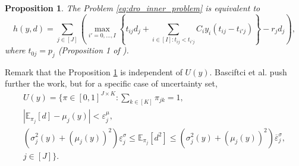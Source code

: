 \documentclass[12pt, letterpaper]{article}
\newcommand{\E}{\mathbb{E}}
\newtheorem{proposition}{Proposition}
\begin{document}
	\begin{proposition} \label{prop:duality_inner_problem}
		The Problem \eqref{eq:dro_inner_problem} is equivalent to
		\begin{equation} \label{eq:dro_equiv_inner_problem}
			h(y, d) = \sum_{j \in [J]} \left(\max_{i' = 0, \dots, I} \left\{t_{ij} d_j + \sum_{i \in [I]: t_{ij} < t_{i'j}} C_{i}y_{i}(t_{ij} - t_{i'j})\right\} - r_j d_j\right),
		\end{equation}
		where $t_{0j} = p_j$ (Proposition 1 of \cite{basciftci_distributionally_2021}).
	\end{proposition}
	
	Remark that the Proposition \ref{prop:duality_inner_problem} is independent of $U(y)$. Basciftci et al. push further the work, but for a specific case of uncertainty set,
	\begin{equation} \label{eq:def_dd_BAS_uncertainty_set}
		\begin{split}
			U(y) = \Bigg\{
				\pi \in [0, 1]^{J \times K} : \sum_{k \in [K]} \pi_{jk} = 1, \\
				\left|\E_{\pi_j}[d] - \mu_j(y)\right| < \varepsilon_j^\mu, \\
				\left(\sigma_j^2(y) + (\mu_j(y))^2\right)\underline{\varepsilon}_j^\sigma \le
				\E_{\pi_j}[d^2] \le \left(\sigma_j^2(y) + (\mu_j(y))^2\right)\overline{\varepsilon}_j^\sigma, \\
				j \in [J]
			\Bigg\}.
		\end{split}
	\end{equation}	
	
\end{document}
